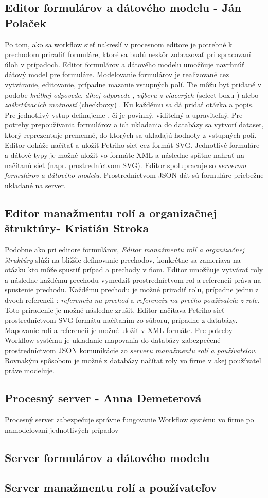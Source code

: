 \subsection{Editor formulárov a dátového modelu - Ján Polaček}
Po tom, ako sa workflow sieť nakreslí v procesnom editore je potrebné k prechodom priradiť formuláre, ktoré sa budú neskôr zobrazovať pri spracovaní úloh v prípadoch. Editor formulárov a dátového modelu umožňuje navrhnúť dátový model pre formuláre. Modelovanie formulárov je realizované cez vytváranie, editovanie, prípadne mazanie vstupných polí. Tie môžu byť pridané v podobe \emph{krátkej odpovede}, \emph{dlhej odpovede} , \emph{výberu z viacerých} (select boxu ) 	alebo \emph{zaškrtávacích možností } (checkboxy) . Ku každému sa dá pridať otázka a popis. Pre jednotlivý vstup definujeme , či je povinný, viditeľný a upraviteľný. Pre potreby prepoužívania formulárov a ich ukladania do databázy sa vytvorí dataset, ktorý reprezentuje premenné, do ktorých sa ukladajú hodnoty z vstupných polí. Editor dokáže načítať a uložiť Petriho sieť cez formát SVG. Jednotlivé formuláre a dátové typy je možné uložiť vo formáte XML a následne spätne nahrať na načítanú sieť (napr. prostredníctvom SVG). Editor spolupracuje so \emph{serverom formulárov a dátového modelu}. Prostredníctvom JSON dát sú formuláre priebežne ukladané na server.

\subsection{Editor manažmentu rolí a organizačnej štruktúry- Kristián Stroka}
Podobne ako pri editore formulárov, \emph{Editor manažmentu rolí a organizačnej štruktúry} slúži na bližšie definovanie prechodov, konkrétne sa zameriava na otázku kto môže spustiť prípad a prechody v ňom. Editor umožňuje vytvárať roly a následne každému prechodu vymedziť prostredníctvom  rol a referencii práva na spustenie prechodu. Každému prechodu je možné priradiť rolu, prípadne jednu z dvoch referencii : \emph{referenciu na prechod} a \emph{referenciu na prvého používateľa z role}. Toto priradenie je možné následne zrušiť. Editor načítava Petriho sieť prostredníctvom SVG formátu načítaním zo súboru, prípadne z databázy. Mapovanie rolí a referencii je možné uložiť v XML formáte. Pre potreby Workflow systému je ukladanie mapovania do databázy zabezpečené prostredníctvom JSON komunikácie  zo \emph{serveru manažmentu rolí a používateľov}. Rovnakým spôsobom je možné z databázy načítať roly vo firme v akej používateľ práve modeluje.

\subsection{Procesný server - Anna Demeterová}
Procesný server zabezpečuje správne fungovanie Workflow systému vo firme po namodelovaní jednotlivých prípadov 

\subsection{Server formulárov a dátového modelu}
\subsection{Server manažmentu rolí a používateľov}

	


	

